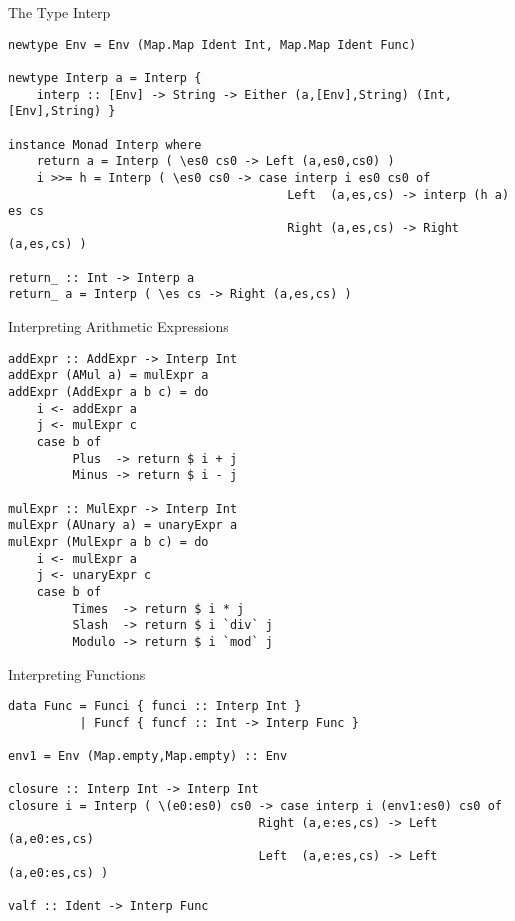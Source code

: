 \documentclass[12pt]{beamer}
\newcommand{\codesize}{\fontsize{7.7}{7.7}}
\begin{document}
\begin{spacing}{1.3}
\begin{frame}[fragile=singleslide]{The Type Interp}
\begin{verbatim}
newtype Env = Env (Map.Map Ident Int, Map.Map Ident Func)

newtype Interp a = Interp {
    interp :: [Env] -> String -> Either (a,[Env],String) (Int,[Env],String) }

instance Monad Interp where
    return a = Interp ( \es0 cs0 -> Left (a,es0,cs0) )
    i >>= h = Interp ( \es0 cs0 -> case interp i es0 cs0 of
                                       Left  (a,es,cs) -> interp (h a) es cs
                                       Right (a,es,cs) -> Right  (a,es,cs) )
                                       
return_ :: Int -> Interp a
return_ a = Interp ( \es cs -> Right (a,es,cs) )
\end{verbatim}
\end{frame}

\begin{frame}[fragile=singleslide]{Interpreting Arithmetic Expressions}
\begin{verbatim}
addExpr :: AddExpr -> Interp Int
addExpr (AMul a) = mulExpr a
addExpr (AddExpr a b c) = do
    i <- addExpr a
    j <- mulExpr c
    case b of
         Plus  -> return $ i + j
         Minus -> return $ i - j

mulExpr :: MulExpr -> Interp Int
mulExpr (AUnary a) = unaryExpr a
mulExpr (MulExpr a b c) = do
    i <- mulExpr a
    j <- unaryExpr c
    case b of
         Times  -> return $ i * j
         Slash  -> return $ i `div` j
         Modulo -> return $ i `mod` j
\end{verbatim}
\end{frame}

\begin{frame}[fragile=singleslide]{Interpreting Functions}
\begin{verbatim}
data Func = Funci { funci :: Interp Int }
          | Funcf { funcf :: Int -> Interp Func }

env1 = Env (Map.empty,Map.empty) :: Env

closure :: Interp Int -> Interp Int
closure i = Interp ( \(e0:es0) cs0 -> case interp i (env1:es0) cs0 of
                                   Right (a,e:es,cs) -> Left (a,e0:es,cs)
                                   Left  (a,e:es,cs) -> Left (a,e0:es,cs) )
                  
valf :: Ident -> Interp Func


\end{verbatim}
\end{frame}
\end{spacing}
\end{document}
